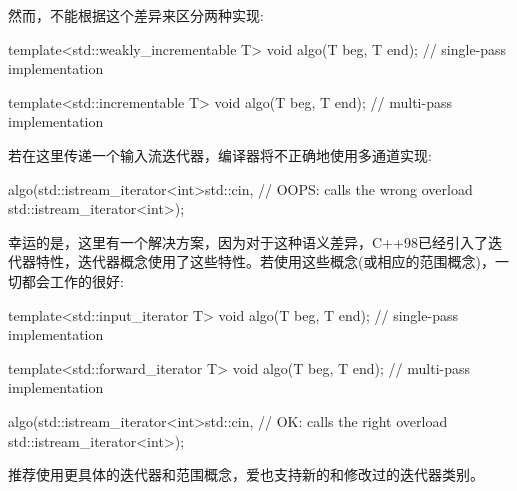 然而，不能根据这个差异来区分两种实现:

\begin{cpp}
template<std::weakly_incrementable T>
void algo(T beg, T end); // single-pass implementation

template<std::incrementable T>
void algo(T beg, T end); // multi-pass implementation
\end{cpp}

若在这里传递一个输入流迭代器，编译器将不正确地使用多通道实现:

\begin{cpp}
algo(std::istream_iterator<int>{std::cin}, // OOPS: calls the wrong overload
	 std::istream_iterator<int>{});
\end{cpp}

幸运的是，这里有一个解决方案，因为对于这种语义差异，C++98已经引入了迭代器特性，迭代器概念使用了这些特性。若使用这些概念(或相应的范围概念)，一切都会工作的很好:

\begin{cpp}
template<std::input_iterator T>
void algo(T beg, T end); // single-pass implementation
	
template<std::forward_iterator T>
void algo(T beg, T end); // multi-pass implementation

algo(std::istream_iterator<int>{std::cin}, // OK: calls the right overload
	std::istream_iterator<int>{});
\end{cpp}

推荐使用更具体的迭代器和范围概念，爱也支持新的和修改过的迭代器类别。


















